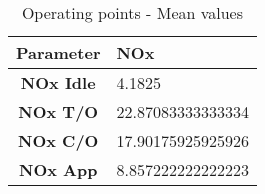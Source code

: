 \begin{table}[h!]
  \centering
  \begin{tabularx}{\textwidth}{||c|X||}
  \hline
    \cellcolor{gray!20}\textbf{Parameter} & \cellcolor{gray!20}\textbf{NOx} \\ [0.5ex]
  \hline\hline
\centering
    \cellcolor{gray!20}\textbf{NOx Idle} & 4.1825 \\
  \hline
    \cellcolor{gray!20}\textbf{NOx T/O} & 22.87083333333334 \\
  \hline
    \cellcolor{gray!20}\textbf{NOx C/O} & 17.90175925925926 \\
  \hline
    \cellcolor{gray!20}\textbf{NOx App} & 8.857222222222223 \\
  \hline
  \end{tabularx}
  \caption{Operating points - Mean values}
  \label{tab:means}
\end{table}
